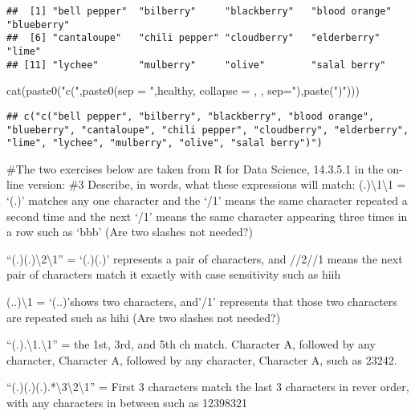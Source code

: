 \documentclass[
]{article}
\newenvironment{Shaded}{\begin{snugshade}}{\end{snugshade}}
\newcommand{\AttributeTok}[1]{\textcolor[rgb]{0.77,0.63,0.00}{#1}}
\newcommand{\FunctionTok}[1]{\textcolor[rgb]{0.00,0.00,0.00}{#1}}
\newcommand{\NormalTok}[1]{#1}
\newcommand{\StringTok}[1]{\textcolor[rgb]{0.31,0.60,0.02}{#1}}
\begin{document}
\begin{verbatim}
##  [1] "bell pepper"  "bilberry"     "blackberry"   "blood orange" "blueberry"   
##  [6] "cantaloupe"   "chili pepper" "cloudberry"   "elderberry"   "lime"        
## [11] "lychee"       "mulberry"     "olive"        "salal berry"
\end{verbatim}

\begin{Shaded}
\begin{Highlighting}[]
\FunctionTok{cat}\NormalTok{(}\FunctionTok{paste0}\NormalTok{(}\StringTok{"c("}\NormalTok{,}\FunctionTok{paste0}\NormalTok{(}\AttributeTok{sep =} \StringTok{\textquotesingle{}"\textquotesingle{}}\NormalTok{,healthy, }\AttributeTok{collapse =} \StringTok{\textquotesingle{}, \textquotesingle{}}\NormalTok{, }\AttributeTok{sep=}\StringTok{\textquotesingle{}"\textquotesingle{}}\NormalTok{),}\FunctionTok{paste}\NormalTok{(}\StringTok{")"}\NormalTok{)))}
\end{Highlighting}
\end{Shaded}

\begin{verbatim}
## c("c("bell pepper", "bilberry", "blackberry", "blood orange", "blueberry", "cantaloupe", "chili pepper", "cloudberry", "elderberry", "lime", "lychee", "mulberry", "olive", "salal berry")")
\end{verbatim}

\#The two exercises below are taken from R for Data Science, 14.3.5.1 in
the on-line version: \#3 Describe, in words, what these expressions will
match: (.)\textbackslash1\textbackslash1 = `(.)' matches any one
character and the `/1' means the same character repeated a second time
and the next `/1' means the same character appearing three times in a
row such as `bbb' (Are two slashes not needed?)

``(.)(.)\textbackslash2\textbackslash1'' = `(.)(.)' represents a pair of
characters, and //2//1 means the next pair of characters match it
exactly with case sensitivity such as hiih

(..)\textbackslash1 = `(..)'shows two characters, and'/1' represents
that those two characters are repeated such as hihi (Are two slashes not
needed?)

``(.).\textbackslash1.\textbackslash1'' = the 1st, 3rd, and 5th ch
match. Character A, followed by any character, Character A, followed by
any character, Character A, such as 23242.

``(.)(.)(.).*\textbackslash3\textbackslash2\textbackslash1'' = First 3
characters match the last 3 characters in rever order, with any
characters in between such as 12398321
\end{document}
